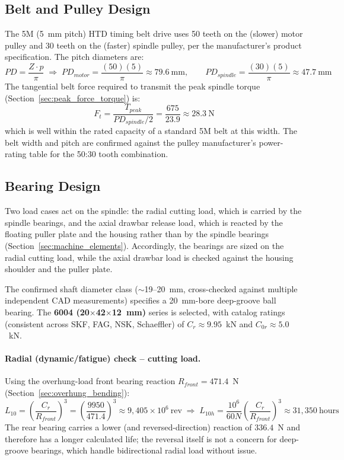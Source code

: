 \documentclass[12pt,a4paper]{report}
\begin{document}
	\subsection{Belt and Pulley Design}\label{sec:belt_pulley}
	The 5M (5~mm pitch) HTD timing belt drive uses 50 teeth on the (slower) motor pulley and
	30 teeth on the (faster) spindle pulley, per the manufacturer's product specification. The
	pitch diameters are:
	\begin{equation}
		PD = \frac{Z \cdot p}{\pi} \;\Rightarrow\; PD_{motor} = \frac{(50)(5)}{\pi} \approx 79.6~\text{mm}, \qquad
		PD_{spindle} = \frac{(30)(5)}{\pi} \approx 47.7~\text{mm}
	\end{equation}
	The tangential belt force required to transmit the peak spindle torque (Section~\ref{sec:peak_force_torque}) is:
	\begin{equation}
		F_t = \frac{T_{peak}}{PD_{spindle}/2} = \frac{675}{23.9} \approx 28.3~\text{N}
	\end{equation}
	which is well within the rated capacity of a standard 5M belt at this width. The belt
	width and pitch are confirmed against the pulley manufacturer's power-rating table for the
	50:30 tooth combination.
	
	\subsection{Bearing Design}\label{sec:bearing_design}
	Two load cases act on the spindle: the radial cutting load, which is carried by the spindle
	bearings, and the axial drawbar release load, which is reacted by the floating puller plate
	and the housing rather than by the spindle bearings (Section~\ref{sec:machine_elements}).
	Accordingly, the bearings are sized on the radial cutting load, while the axial drawbar load
	is checked against the housing shoulder and the puller plate.
	
	The confirmed shaft diameter class ($\sim$19--20~mm, cross-checked against multiple
	independent CAD measurements) specifies a 20~mm-bore deep-groove ball bearing. The
	\textbf{6004 (20$\times$42$\times$12~mm)} series is selected, with catalog ratings
	(consistent across SKF, FAG, NSK, Schaeffler) of $C_r \approx 9.95$~kN and
	$C_{0r}\approx5.0$~kN.
	
	\paragraph{Radial (dynamic/fatigue) check -- cutting load.} Using the overhung-load front
	bearing reaction $R_{front} = 471.4$~N (Section~\ref{sec:overhung_bending}):
	\begin{equation}
		L_{10} = \left(\frac{C_r}{R_{front}}\right)^3 = \left(\frac{9950}{471.4}\right)^3 \approx 9{,}405 \times 10^6~\text{rev}
		\;\Rightarrow\;
		L_{10h} = \frac{10^6}{60N}\left(\frac{C_r}{R_{front}}\right)^3 \approx 31{,}350~\text{hours}
	\end{equation}
	The rear bearing carries a lower (and reversed-direction) reaction of $336.4$~N and therefore
	has a longer calculated life; the reversal itself is not a concern for deep-groove bearings,
	which handle bidirectional radial load without issue. 
\end{document}
